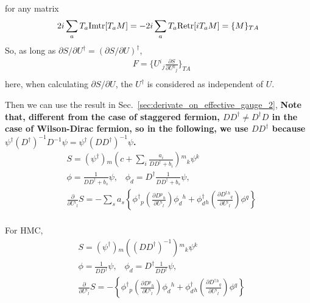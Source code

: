 for any matrix \textcolor[rgb]{0,0,1}{
\begin{equation}
\begin{split}
&2i \sum _a T_a {\rm Im tr}[T_a M] = -2 i \sum _a T_a {\rm Re tr}[i T_a M] = \{M\}_{TA}\\
\end{split}
\end{equation}
}
So, \textcolor[rgb]{0,0,1}{as long as $\partial S / \partial U^{\dagger} = \left(\partial S/ \partial U\right)^{\dagger}$,
\begin{equation}
\begin{split}
&F= \{U{}^i{}_j \frac{\partial S}{\partial U{}^k{}_j}\}_{TA}\\
\end{split}
\end{equation}
here, when calculating $\partial S/ \partial U$, the $U^{\dagger}$ is considered as independent of $U$.}

Then we can use the result in Sec.~\ref{sec:derivate_on_effective_gauge_2}, \textbf{Note that, different from the case of staggered fermion, $DD^{\dagger}\neq D^{\dagger}D$ in the case of Wilson-Dirac fermion, so in the following, we use $DD^{\dagger}$ because $\psi^{\dagger}(D^{\dagger})^{-1}D^{-1}\psi = \psi^{\dagger}\left(DD^{\dagger}\right)^{-1}\psi$.}
\begin{equation}
\begin{split}
&S=(\psi ^{\dagger}){}_m \left(c+\sum _i\frac{a_i}{DD^{\dagger}+b_i}\right){}^m{}_k \psi{}^k\\
&\phi  = \frac{1}{DD^{\dagger}+b_s}\psi, \;\;\;\phi _d = D^{\dagger}\frac{1}{DD^{\dagger}+b_s}\psi,\\
&\frac{\partial}{\partial U{}^i{}_l}S=-\sum _sa_s{} \left\{\phi ^{\dagger}{}_p\left(\frac{\partial D{}^p{}_h}{\partial U{}^i{}_l} \right) \phi _d {}^h+ 
\phi _d^{\dagger}{}_h\left(\frac{\partial D^{\dagger}{}^h{}_q}{\partial U{}^i{}_l}\right) \phi {}^q\right\}\\
\end{split}
\end{equation}

For HMC,
\begin{equation}
\begin{split}
&S=(\psi ^{\dagger}){}_m \left((DD^{\dagger})^{-1}\right){}^m{}_k \psi{}^k\\
&\phi  = \frac{1}{DD^{\dagger}}\psi, \;\;\;\phi _d = D^{\dagger}\frac{1}{DD^{\dagger}}\psi,\\
&\frac{\partial}{\partial U{}^i{}_l}S=-\left\{\phi ^{\dagger}{}_p\left(\frac{\partial D{}^p{}_h}{\partial U{}^i{}_l} \right) \phi _d {}^h+ 
\phi _d^{\dagger}{}_h\left(\frac{\partial D^{\dagger}{}^h{}_q}{\partial U{}^i{}_l}\right) \phi {}^q\right\}\\
\end{split}
\end{equation}

